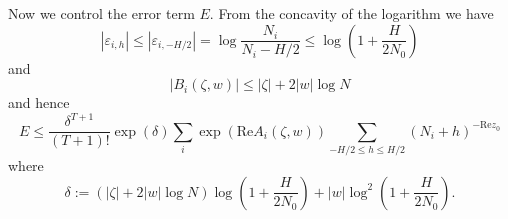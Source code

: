 Now we control the error term $E$.  From the concavity of the logarithm we have
$$|\varepsilon_{i,h}| \leq |\varepsilon_{i,-H/2}| = \log \frac{N_i}{N_i-H/2} \leq \log(1 + \frac{H}{2N_0})$$
and
$$ |B_i(\zeta,w)| \leq |\zeta| + 2 |w| \log N$$
and hence
$$ E \leq \frac{\delta^{T+1}}{(T+1)!} \exp( \delta) \sum_i \exp( \mathrm{Re} A_i(\zeta,w) )
\sum_{-H/2 \leq h \leq H/2} (N_i+h)^{-\mathrm{Re} z_0}
$$
where
$$ \delta := (|\zeta| + 2 |w| \log N) \log(1+\frac{H}{2N_0}) + |w| \log^2(1+\frac{H}{2N_0}).$$



